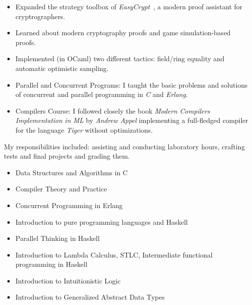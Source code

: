     \begin{itemize}
        \item Expanded the strategy toolbox of
            \emph{EasyCrypt}~\cite{EasyCrypt}, a modern proof assistant for cryptrographers.
        \item Learned about modern cryptography proofs and game simulation-based proofs.
        \item Implemented (in OCaml) two different tactics: field/ring equality
            and automatic optimistic sampling.
    \end{itemize}

\newpage


    \begin{itemize}
        \item Parallel and Concurrent Programs: I taught the basic
            problems and solutions of concurrent and parallel programming in \emph{C} and \emph{Erlang}.
        \item Compilers Course: I followed closely the book \emph{Modern
                Compilers Implementation in ML} by \emph{Andrew Appel}
            implementing a full-fledged compiler for the language
            \emph{Tiger} without optimizations.
    \end{itemize}
    \divider

    My responsibilities included: assisting and conducting laboratory
    hours, crafting tests and final projects and grading them.
    \begin{itemize}
        \item {Data Structures and Algorithms in C}
        \item {Compiler Theory and Practice}
        \item {Concurrent Programming in Erlang}
        \item {Introduction to pure programming languages and Haskell}
        \item {Parallel Thinking in Haskell}
        \item {Introduction to Lambda Calculus, STLC, Intermediate functional programming in Haskell}
        \item {Introduction to Intuitionistic Logic}
        \item {Introduction to Generalized Abstract Data Types}
    \end{itemize}

